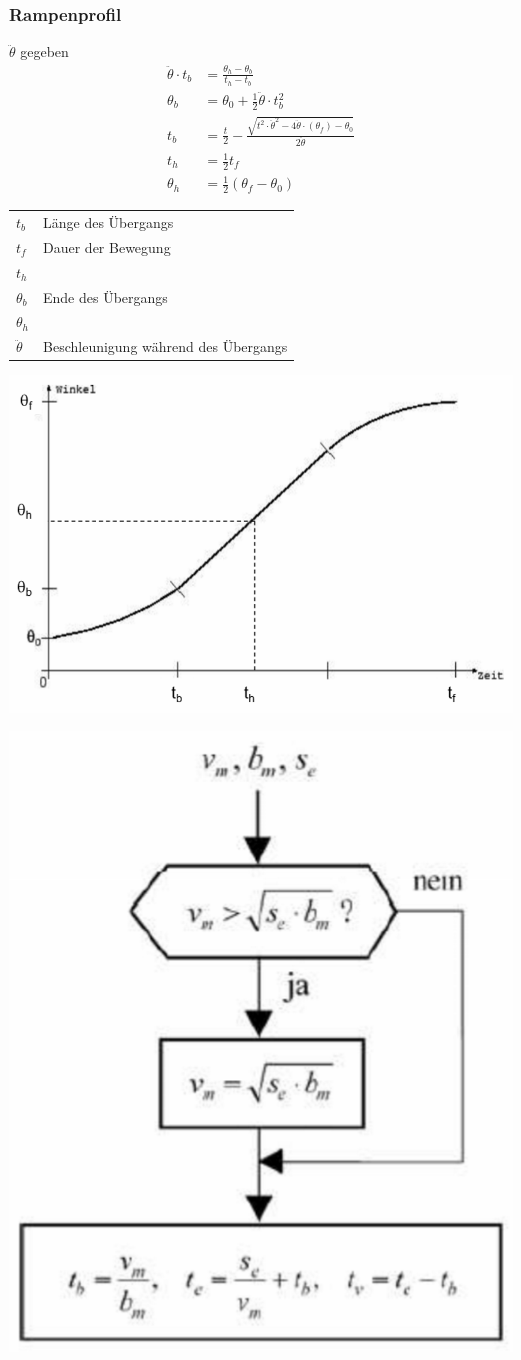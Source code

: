 \subsubsection{Rampenprofil}
\begin{minipage}{0.5\linewidth}
    {\small 
    $\ddot{\theta}$ gegeben\newline
    \begin{align*}
        \ddot{\theta}\cdot t_b &= \frac{\theta_h-\theta_b}{t_h - t_b}\\
        \theta_b &=\theta_0 + \frac{1}{2}\ddot{\theta}\cdot t_b^2\\
        t_b &= \frac{t}{2}- \frac{\sqrt{t^2\cdot \ddot{\theta}^2-4\ddot{\theta}\cdot(\theta_f)- \theta_0}}{2\ddot{\theta}}\\
        t_h &= \frac{1}{2}t_f\\
        \theta_h &=\frac{1}{2}(\theta_f -\theta_0)
    \end{align*}
    \begin{tabular}{ll}
        $t_b$ & Länge des Übergangs\\
        $t_f$ & Dauer der Bewegung\\
        $t_h$ & \\
        $\theta_b$& Ende des Übergangs\\
        $\theta_h$& \\
        $\ddot{\theta}$& Beschleunigung während des Übergangs\\
    \end{tabular}}
\end{minipage}
\begin{minipage}{0.5\linewidth}
    \includegraphics[width=\linewidth]{./bilder/RampenprofilInterpol}
\end{minipage}
\includegraphics[width=0.3\linewidth]{./bilder/RampenVorgehn}

